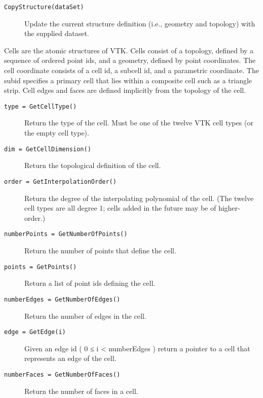 \begin{description}[leftmargin=0cm,labelindent=0cm]
\begin{description}
    \item[\texttt{CopyStructure(dataSet)}]
    Update the current structure definition (i.e., geometry and topology) with the supplied dataset.
    \end{description}

\item[Cell Abstraction.\index{abstraction!cell|(}\index{cell!abstraction|(}] Cells are the atomic structures of VTK. Cells consist of a topology, defined by a sequence of ordered point ids, and a geometry, defined by point coordinates. The cell coordinate consists of a cell id, a subcell id, and a parametric coordinate. The subid specifies a primary cell that lies within a composite cell such as a triangle strip. Cell edges and faces are defined implicitly from the topology of the cell.
    \begin{description}

    \item[\texttt{type = GetCellType()}]
    Return the type of the cell. Must be one of the twelve VTK cell types (or the empty cell type).

    \item[\texttt{dim = GetCellDimension()}]
    Return the topological definition of the cell.

    \item[\texttt{order = GetInterpolationOrder()}]
    Return the degree of the interpolating polynomial of the cell. (The twelve cell types are all degree 1; cells added in the future may be of higher-order.)

    \item[\texttt{numberPoints = GetNumberOfPoints()}]
    Return the number of points that define the cell.

    \item[\texttt{points = GetPoints()}]
    Return a list of point ids defining the cell.

    \item[\texttt{numberEdges = GetNumberOfEdges()}]
    Return the number of edges in the cell.

    \item[\texttt{edge = GetEdge(i)}]
    Given an edge id ( 0 ≤ i < numberEdges ) return a pointer to a cell that represents an edge of the cell.

    \item[\texttt{numberFaces = GetNumberOfFaces()}]
    Return the number of faces in a cell.


\end{description}
\end{description}
